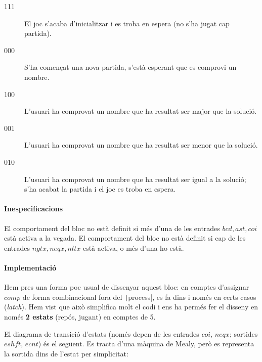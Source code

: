\begin{description}
\item[111] El joc s'acaba d'inicialitzar i es troba en espera (no s'ha jugat cap partida).
\item[000] S'ha començat una nova partida, s'està esperant que es comprovi un nombre.
\item[100] L'usuari ha comprovat un nombre que ha resultat ser major que la solució.
\item[001] L'usuari ha comprovat un nombre que ha resultat ser menor que la solució.
\item[010] L'usuari ha comprovat un nombre que ha resultat ser igual a la solució;
s'ha acabat la partida i el joc es troba en espera.
\end{description}

\paragraph{Inespecificacions}


El comportament del bloc no està definit si més d'una de les entrades $bcd, ast, coi$ està activa a la vegada.
El comportament del bloc no està definit si cap de les entrades $ngtx, neqx, nltx$ està activa, o més d'una ho està.


\paragraph{Implementació}




Hem pres una forma poc usual de dissenyar aquest bloc: en comptes d'assignar
$comp$ de forma combinacional fora del \texttt|process|, es fa dins
i només en certs casos (\emph{latch}). Hem vist que això simplifica molt el
codi i ens ha permés fer el disseny en només \textbf{2 estats} (repós, jugant)
en comptes de 5.

El diagrama de transició d'estats (només depen de les entrades $coi$, $neqx$; sortides $eshft$, $ecnt$) és el següent. Es tracta
d'una màquina de Mealy, però es representa la sortida dins de l'estat per simplicitat:

\begin{center}  \end{center}


